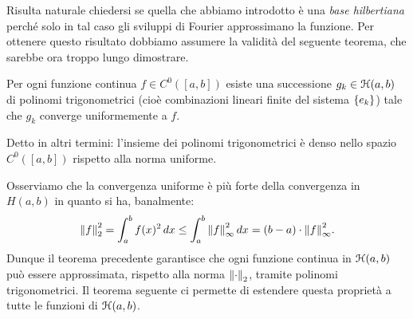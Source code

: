 Risulta naturale chiedersi se quella che abbiamo introdotto è una
\emph{base hilbertiana} perché solo in tal caso gli sviluppi di Fourier
approssimano la funzione.
Per ottenere questo risultato dobbiamo assumere la validità del seguente
teorema, che sarebbe ora troppo lungo dimostrare.

\begin{theorem}
Per ogni funzione continua $f\in C^0([a,b])$
esiste una successione $g_k\in \mathcal H(a,b)$ di polinomi trigonometrici
(cioè combinazioni lineari finite del sistema ${\left\{ e_k \right\}}$)
tale che $g_k$ converge uniformemente a $f$.

Detto in altri termini: l'insieme dei polinomi trigonometrici
è denso nello spazio $C^0([a,b])$ rispetto alla norma uniforme.
\end{theorem}

Osserviamo che la convergenza uniforme è più forte della convergenza
in $H(a,b)$ in quanto si ha, banalmente:
\[
  {\left\Vert f\right\Vert}_2^2 = \int_a^b f(x)^2\, dx
  \le \int_a^b {\left\Vert f\right\Vert}_\infty^2\, dx
  = (b-a) \cdot {\left\Vert f\right\Vert}_\infty^2.
\]
Dunque il teorema precedente garantisce che ogni funzione continua
in $\mathcal H(a,b)$ può essere approssimata, rispetto alla norma ${\left\Vert \cdot\right\Vert}_2$,
tramite polinomi trigonometrici. Il teorema seguente ci permette
di estendere questa proprietà a tutte le funzioni di $\mathcal H(a,b)$.

